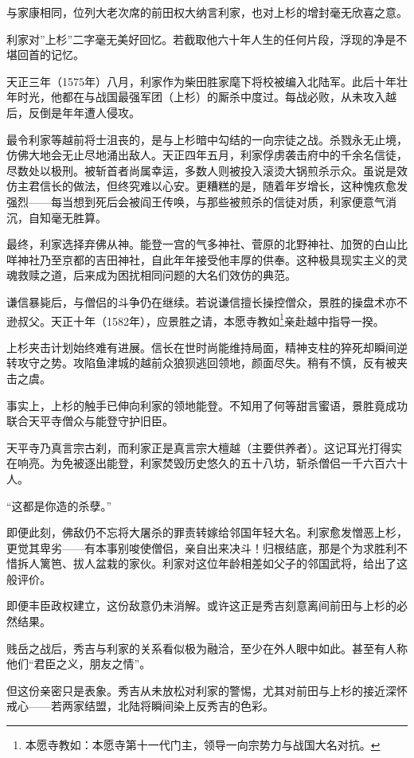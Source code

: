 \documentclass[
]{article}
\begin{document}
与家康相同，位列大老次席的前田权大纳言利家，也对上杉的增封毫无欣喜之意。

利家对''上杉''二字毫无美好回忆。若截取他六十年人生的任何片段，浮现的净是不堪回首的记忆。

天正三年（1575年）八月，利家作为柴田胜家麾下将校被编入北陆军。此后十年壮年时光，他都在与战国最强军团（上杉）的厮杀中度过。每战必败，从未攻入越后，反倒是年年遭人侵攻。

最令利家等越前将士沮丧的，是与上杉暗中勾结的一向宗徒之战。杀戮永无止境，仿佛大地会无止尽地涌出敌人。天正四年五月，利家俘虏袭击府中的千余名信徒，尽数处以极刑。被斩首者尚属幸运，多数人则被投入滚烫大锅煎杀示众。虽说是效仿主君信长的做法，但终究难以心安。更糟糕的是，随着年岁增长，这种愧疚愈发强烈------每当想到死后会被阎王传唤，与那些被煎杀的信徒对质，利家便意气消沉，自知毫无胜算。

最终，利家选择弃佛从神。能登一宫的气多神社、菅原的北野神社、加贺的白山比咩神社乃至京都的吉田神社，自此年年接受他丰厚的供奉。这种极具现实主义的灵魂救赎之道，后来成为困扰相同问题的大名们效仿的典范。

谦信暴毙后，与僧侣的斗争仍在继续。若说谦信擅长操控僧众，景胜的操盘术亦不逊叔父。天正十年（1582年），应景胜之请，本愿寺教如\footnote{本愿寺教如：本愿寺第十一代门主，领导一向宗势力与战国大名对抗。}亲赴越中指导一揆。

上杉夹击计划始终难有进展。信长在世时尚能维持局面，精神支柱的猝死却瞬间逆转攻守之势。攻陷鱼津城的越前众狼狈逃回领地，颜面尽失。稍有不慎，反有被夹击之虞。

事实上，上杉的触手已伸向利家的领地能登。不知用了何等甜言蜜语，景胜竟成功联合天平寺僧众与能登守护旧臣。

天平寺乃真言宗古刹，而利家正是真言宗大檀越（主要供养者）。这记耳光打得实在响亮。为免被逐出能登，利家焚毁历史悠久的五十八坊，斩杀僧侣一千六百六十人。

``这都是你造的杀孽。''

即便此刻，佛敌仍不忘将大屠杀的罪责转嫁给邻国年轻大名。利家愈发憎恶上杉，更觉其卑劣------有本事别唆使僧侣，亲自出来决斗！归根结底，那是个为求胜利不惜拆人篱笆、拔人盆栽的家伙。利家对这位年龄相差如父子的邻国武将，给出了这般评价。

即便丰臣政权建立，这份敌意仍未消解。或许这正是秀吉刻意离间前田与上杉的必然结果。

贱岳之战后，秀吉与利家的关系看似极为融洽，至少在外人眼中如此。甚至有人称他们``君臣之义，朋友之情''。

但这份亲密只是表象。秀吉从未放松对利家的警惕，尤其对前田与上杉的接近深怀戒心------若两家结盟，北陆将瞬间染上反秀吉的色彩。
\end{document}
